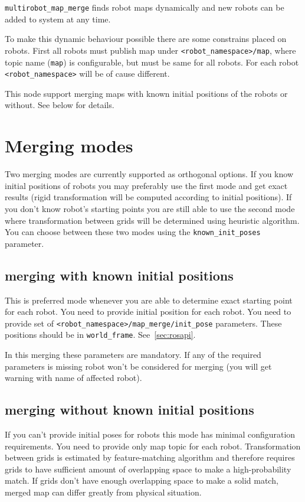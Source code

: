 \texttt{multirobot_map_merge} finds robot maps dynamically and new robots can be added to system at any time.


To make this dynamic behaviour possible there are some constrains placed on robots. First all robots must publish map under \texttt{<robot_namespace>/map}, where topic name (\texttt{map}) is configurable, but must be same for all robots. For each robot \texttt{<robot_namespace>} will be of cause different.

This node support merging maps with known initial positions of the robots or without. See below for details.

\section{Merging modes}
\label{sec:mergingmodes}

Two merging modes are currently supported as orthogonal options. If you know initial positions of robots you may preferably use the first mode and get exact results (rigid transformation will be computed according to initial positions). If you don't know robot's starting points you are still able to use the second mode where transformation between grids will be determined using heuristic algorithm. You can choose between these two modes using the \texttt{known_init_poses} parameter.

\subsection{merging with known initial positions}

This is preferred mode whenever you are able to determine exact starting point for each robot. You need to provide initial position for each robot. You need to provide set of \texttt{<robot_namespace>/map_merge/init_pose} parameters. These positions should be in \texttt{world_frame}. See~\ref{sec:rosapi}.

In this merging these parameters are mandatory. If any of the required parameters is missing robot won't be considered for merging (you will get warning with name of affected robot).

\subsection{merging without known initial positions}

If you can't provide initial poses for robots this mode has minimal configuration requirements. You need to provide only map topic for each robot. Transformation between grids is estimated by feature-matching algorithm and therefore requires grids to have sufficient amount of overlapping space to make a high-probability match. If grids don't have enough overlapping space to make a solid match, merged map can differ greatly from physical situation.

